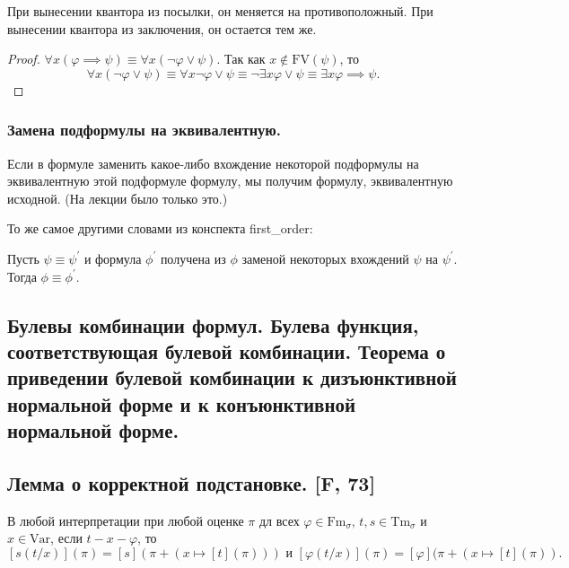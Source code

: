 \documentclass[a4paper, fleqn]{article}
\begin{document}
    При вынесении квантора из посылки, он меняется на противоположный.
    При вынесении квантора из заключения, он остается тем же.
    
    \begin{proof}
        $\forall x (\varphi \implies \psi) \equiv \forall x (\neg \varphi \lor \psi)$.
        Так как $x \notin \text{FV}(\psi)$, то
        \[
            \forall x (\neg \varphi \lor \psi) \equiv \forall x \neg \varphi \lor 
            \psi \equiv \neg \exists x \varphi \lor \psi \equiv \exists x \varphi 
            \implies \psi.
        \]
    \end{proof}

    \subsubsection{Замена подформулы на эквивалентную.}

    Если в формуле заменить какое-либо вхождение некоторой подформулы на 
    эквивалентную этой подформуле формулу, мы получим формулу, эквивалентную исходной.
    (На лекции было только это.)
    
    То же самое другими словами из конспекта first\_order:

    \begin{lemma}
        Пусть $\psi \equiv \psi^\prime$ и формула $\phi^\prime$ получена из $\phi$ 
        заменой некоторых вхождений $\psi$ на $\psi^\prime$. Тогда $\phi \equiv \phi^\prime$.
    \end{lemma}

    \subsection{Булевы комбинации формул. Булева функция, соответствующая булевой комбинации. Теорема о приведении булевой комбинации к дизъюнктивной нормальной форме и к конъюнктивной нормальной форме.}

    \subsection{Лемма о корректной подстановке. [F, 73]}
    \begin{lemma} В любой интерпретации при любой оценке $\pi$ дл всех $\varphi \in \text{Fm}_{\sigma}, \, t, s \in \text{Tm}_{\sigma}$ и $x \in \text{Var}$, если $t-x-\varphi$, то
    \[ [s(t/x)](\pi) = [s](\pi + (x \mapsto [t](\pi))) \text{ и } [\varphi(t/x)](\pi) = [\varphi](\pi + (x \mapsto [t](\pi)). \]
    \end{lemma}
    
\end{document}
